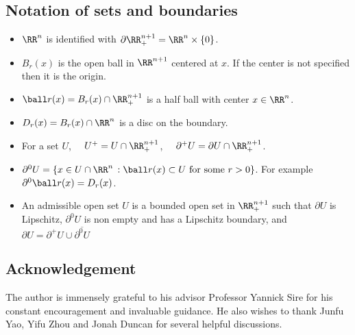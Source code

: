 \subsection*{Notation of sets and boundaries}
\begin{itemize}
    \item  $\RR^n$ is identified with $\partial \RR^{n+1}_+ = \RR^n \times \{0\}$.
    \item  $B_r(x)$ is the open ball in  $\RR^{n+1}$ centered at $x$. If the center is not specified then it is the origin.
    \item $\ball r (x) = B_r(x) \cap \RR^{n+1}_+ $ is a half ball with center $x \in \RR^n$.
    \item $D_r(x)= B_r(x) \cap \RR^{n}$ is a disc on the boundary.
    \item For a set $U$, $\quad U^+=U \cap \RR^{n+1}_+$, $\quad \partial^+ U=\partial  U \cap \RR^{n+1}_+$.
    \item $\partial^0U = \{ x\in U \cap \RR^n \, : \ball r (x) \subset U \text{ for some } r>0 \}$. For example $\partial^0 \ball r (x) = D_r(x)$.
    \item An admissible open set $U$ is a bounded open set in $\RR^{n+1}_+$ such that $\partial U$ is Lipschitz, $\partial^0 U$ is non empty and has a Lipschitz boundary, and $\partial U= \partial^+U \cup \overline{\partial^0U}$
\end{itemize}

 

\subsection*{Acknowledgement} The author is immensely grateful to his advisor Professor Yannick Sire for his constant encouragement and invaluable guidance. He also wishes to thank Junfu Yao, Yifu Zhou and Jonah Duncan for several helpful discussions.























